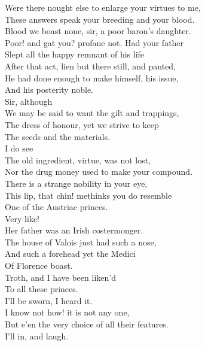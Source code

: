 \documentclass[a4paper,oneside]{memoir}
\begin{document}
\begin{drama*}
\mammonspeaks {} Were there nought else to enlarge your virtues to me,\\
These answers speak your breeding and your blood.\\
\dolspeaks Blood we boast none, sir, a poor baron's daughter.\\
\mammonspeaks Poor! and gat you? profane not. Had your father\\
Slept all the happy remnant of his life\\
After that act, lien but there still, and panted,\\
He had done enough to make himself, his issue,\\
And his posterity noble.\\
\dolspeaks {} Sir, although\\
We may be said to want the gilt and trappings,\\
The dress of honour, yet we strive to keep\\
The seeds and the materials.\\
\mammonspeaks {} I do see\\
The old ingredient, virtue, was not lost,\\
Nor the drug money used to make your compound.\\
There is a strange nobility in your eye,\\
This lip, that chin! methinks you do resemble\\
One of the Austriac princes.\\
\facespeaks {} Very like!\\
Her father was an Irish costermonger.\\
\mammonspeaks The house of Valois just had such a nose,\\
And such a forehead yet the Medici\\
Of Florence boast.\\
\dolspeaks {} Troth, and I have been liken'd\\
To all these princes.\\
\facespeaks {} I'll be sworn, I heard it.\\
\mammonspeaks {} I know not how! it is not any one,\\
But e'en the very choice of all their features.\\
\facespeaks {} I'll in, and laugh.\\

\end{drama*}
\end{document}
